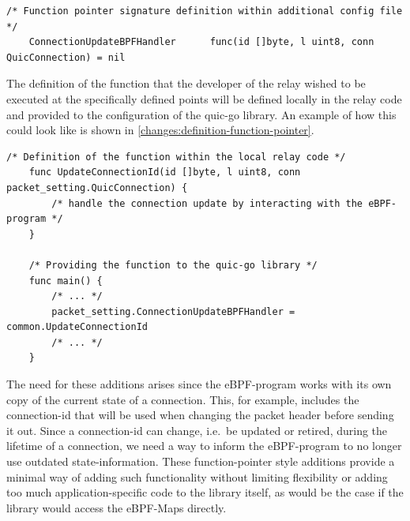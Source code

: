 \vspace{0.5cm}
\noindent\begin{minipage}{\textwidth}
\begin{lstlisting}[style=GoStyle, label=changes:signature-function-pointer, caption=Only the signature will be defined within the library itself.]
    /* Function pointer signature definition within additional config file */
	ConnectionUpdateBPFHandler      func(id []byte, l uint8, conn QuicConnection) = nil
\end{lstlisting}
\end{minipage}

The definition of the function that the developer of the relay wished to be executed at the specifically
defined points will be defined locally in the relay code and provided to the configuration of the quic-go library.
An example of how this could look like is shown in \autoref{changes:definition-function-pointer}.

\vspace{0.5cm}
\noindent\begin{minipage}{\textwidth}
\begin{lstlisting}[style=GoStyle, label=changes:definition-function-pointer, caption=An example of how the addition looks on the relay side.]
    /* Definition of the function within the local relay code */
    func UpdateConnectionId(id []byte, l uint8, conn packet_setting.QuicConnection) {
        /* handle the connection update by interacting with the eBPF-program */
    }   

    /* Providing the function to the quic-go library */
    func main() {
        /* ... */
        packet_setting.ConnectionUpdateBPFHandler = common.UpdateConnectionId
        /* ... */
    }
\end{lstlisting}
\end{minipage}

The need for these additions arises since the eBPF-program works with its own copy of the current state of a connection.
This, for example, includes the connection-id that will be used when changing the packet header before sending it out.
Since a connection-id can change, i.e.~be updated or retired, during the lifetime of a connection, we need a way to inform 
the eBPF-program to no longer use outdated state-information.
These function-pointer style additions provide a minimal way of adding such functionality without limiting flexibility 
or adding too much application-specific code to the library itself, as would be the case if the library would access 
the eBPF-Maps directly.

